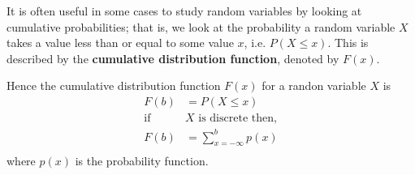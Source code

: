 It is often useful in some cases to study random variables by looking at cumulative probabilities; that is, we
look at the probability a random variable $X$ takes a value less than or equal to some value $x$, i.e. $P(X\leq x)$.
This is described by the \textbf{cumulative distribution function}, denoted by $F(x)$.\newline \par

Hence the cumulative distribution function $F(x)$ for a randon variable $X$ is
\begin{align*}
	F(b)&=P(X\leq x) \\
	\textrm{if }&X\textrm{ is discrete then,} \\
	F(b)&=\sum_{x=-\infty}^{b}p(x)\\
\end{align*}
where $p(x)$ is the probability function.

